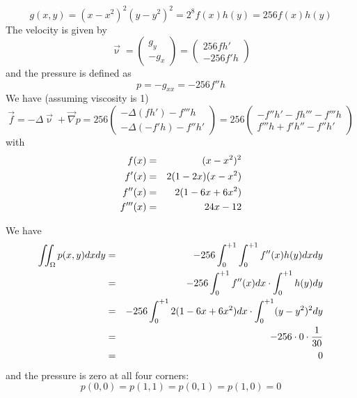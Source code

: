 \[
g(x,y)=(x-x^2)^2(y-y^2)^2 = 2^8 f(x)h(y) = 256 f(x) h(y)
\]
The velocity is given by 
\[
\vec\upnu 
= 
\left(
\begin{array}{c}
g_y \\ -g_x
\end{array}
\right)
=
\left(
\begin{array}{c}
256 fh' \\
-256 f'h
\end{array}
\right)
\]
and the pressure is defined as
\[
p
= -g_{xx}
= -256 f'' h
\]
We have (assuming viscosity is 1) 
\[
\vec{f} = -\Delta \vec{\upnu} + \vec\nabla p
=256
\left(
\begin{array}{c}
- \Delta (fh') -f''' h  \\
-\Delta (-f'h) -f''h'
\end{array}
\right)
=256
\left(
\begin{array}{c}
- f''h' - fh''' -f''' h  \\
 f'''h + f'h''  -f''h'
\end{array}
\right)
\]
with
\begin{eqnarray}
f(x)&=& (x-x^2)^2 \nonumber\\
f'(x) &=& 2(1-2x)(x-x^2) \nonumber\\
f''(x) &=& 2(1-6x+6x^2) \nonumber\\
f'''(x) &=& 24x-12 \nonumber
\end{eqnarray}

We have 
\begin{eqnarray}
\iint_\Omega p(x,y) dxdy 
&=& -256 \int_{0}^{+1}\int_{0}^{+1} f''(x) h(y) dxdy \nonumber\\
&=& -256 \int_{0}^{+1} f''(x) dx \cdot \int_{0}^{+1}  h(y) dy \nonumber\\
&=& -256 \int_{0}^{+1} 2(1-6x+6x^2) dx \cdot \int_{0}^{+1}  (y-y^2)^2 dy \nonumber\\
&=& -256 \cdot 0 \cdot \frac{1}{30}  \nonumber\\ 
&=& 0
\end{eqnarray}
and the pressure is zero at all four corners:
\[
p(0,0)=p(1,1)=p(0,1)=p(1,0)=0
\]


